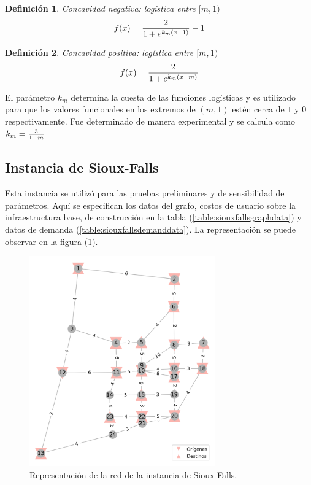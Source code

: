 \documentclass{article}
\newtheorem{definition}{Definición}
\begin{document}
  \begin{definition}
    Concavidad negativa: logística entre $[m, 1)$
    \begin{align}
        f(x) = {2 \over 1 + e^{k_m(x - 1)}} - 1
    \end{align}
  \end{definition}

  \begin{definition}
    Concavidad positiva: logística entre $[m, 1)$
    \begin{align}
        f(x) = {2 \over 1 + e^{k_m(x - m)}}
    \end{align}
  \end{definition}

  El parámetro $k_m$ determina la cuesta de las funciones logísticas y es utilizado para que los valores funcionales en los extremos de $(m, 1)$ estén cerca de $1$ y $0$ respectivamente. Fue determinado de manera experimental y se calcula como $k_m = {3 \over 1 - m}$

  \subsection{Instancia de Sioux-Falls}

  Esta instancia se utilizó para las pruebas preliminares y de sensibilidad de parámetros. Aquí se especifican los datos del grafo, costos de usuario sobre la infraestructura base, de construcción en la tabla (\ref{table:siouxfallsgraphdata}) y datos de demanda (\ref{table:siouxfallsdemanddata}). La representación se puede observar en la figura (\ref{fig:siouxfallsapendix}).

  \begin{figure}[h!]
    \centering
    \includegraphics[width=8cm]{../resources/sioux_falls_odpairs.png}
    \caption{Representación de la red de la instancia de Sioux-Falls.}
    \label{fig:siouxfallsapendix}
  \end{figure}
\end{document}
